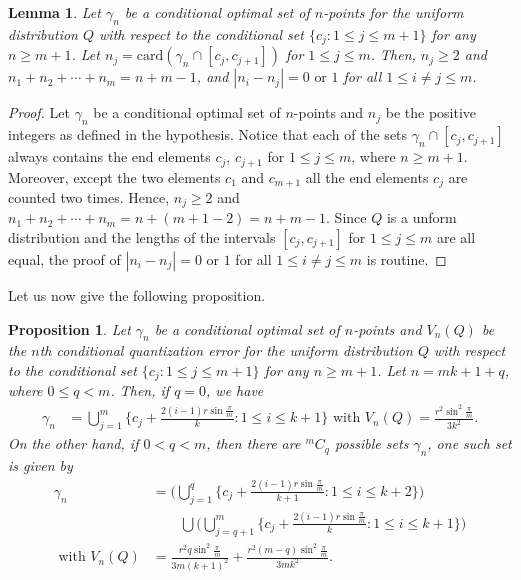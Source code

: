 \documentclass[12pt, reqno]{amsart}
\theoremstyle{plain}
\newtheorem{lemma}[subsection]{Lemma}
\newtheorem{prop}[subsection]{Proposition}
\theoremstyle{definition}
\newcommand{\ii}{\cap}%
\newcommand{\UU}{\bigcup}%
\newcommand{\set}[1]{\{#1\}}%
\renewcommand{\gg}{\gamma}%
\newcommand{\te}{\text}%
\begin{document}
\begin{lemma} \label{lemma34} 
Let $\gg_n$ be a conditional optimal set of $n$-points for the uniform distribution $Q$ with respect to the conditional set $\set{c_j : 1\leq j\leq m+1}$ for any $n\geq m+1$. Let $n_j=\te{card}(\gg_n\ii [c_j, c_{j+1}])$ for $1\leq j\leq m$. Then, $n_j\geq 2$ and $ n_1+n_2+\cdots +n_m=n+m-1$, and $|n_i-n_{j}|=0 \te{ or } 1$  for all $1\leq i\neq  j\leq m$. 
\end{lemma} 
\begin{proof}
Let $\gg_n$ be a conditional optimal set of $n$-points and $n_j$ be the positive integers as defined in the hypothesis. Notice that each of the sets $\gg_n\ii [c_j, c_{j+1}]$ always contains the end elements $c_j,\, c_{j+1}$ for $1\leq j\leq m$, where $n\geq m+1$. Moreover, except the two elements $c_1$ and  $c_{m+1}$ all the end elements $c_j$ are counted two times. Hence,  $n_j\geq 2$ and $n_1+n_2+\cdots +n_m=n+(m+1-2)=n+m-1$.  
Since $Q$ is a unform distribution and the lengths of the intervals $[c_j, c_{j+1}]$ for $1\leq j\leq m$ are all equal, the proof of $|n_i-n_{j}|=0 \te{ or } 1$  for all $1\leq i\neq  j\leq m$ is routine. 
\end{proof} 
 
Let us now give the following proposition. 

\begin{prop} \label{prop45} 
Let $\gg_n$ be a conditional optimal set of $n$-points and $V_n(Q)$ be the $n$th conditional quantization error for the uniform distribution $Q$ with respect to the conditional set $\set{c_j : 1\leq j\leq m+1}$ for any $n\geq m+1$. Let $n=m k +1+q$, where $0\leq q< m$. Then, if $q=0$,  
we have 
\begin{align} \label{Megha101} 
\gg_n& = \UU_{j=1}^{m}\{c_j+\frac{2(i-1)r\sin \frac{\pi}m}{k}  : 1\leq i\leq k+1\} \te{ with } V_n(Q)=\frac {r^2 \sin^2\frac{\pi} m}{3k^2}.
\end{align} 
On the other hand, if $0<q<m$, then there are $^mC_q$ possible sets $\gg_n$, one such set is given by 
\begin{equation}\label{Megha102} 
\begin{aligned} 
\gg_n  &= \Big(\UU_{j=1}^{q}\{c_j+\frac{2(i-1)r\sin \frac{\pi}m}{k+1} : 1\leq i\leq k+2\}\Big)\\
&\qquad \UU \Big(\UU_{j=q+1}^{m}\{c_j+\frac{2(i-1)r\sin \frac{\pi}m}{k}  : 1\leq i\leq k+1\}\Big)\\
\te{ with }    V_n(Q)&=\frac {r^2q\sin^2\frac{\pi} m}{3m(k+1)^2}+ \frac {r^2(m-q)\sin^2\frac{\pi} m}{3mk^2}.
 \end{aligned}
\end{equation}  
 \end{prop} 
\end{document}
